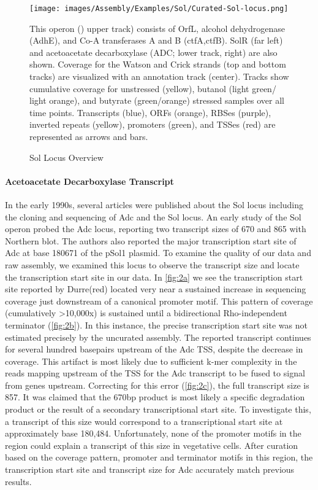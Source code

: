 \begin{figure}
\small
{\texttt{[image: images/Assembly/Examples/Sol/Curated-Sol-locus.png]}
\label{fig:1a}}
\caption{Sol Locus Overview} This operon () upper track) consists of OrfL, alcohol dehydrogenase (AdhE), and Co-A transferases A and B (ctfA,ctfB). SolR (far left) and acetoacetate decarboxylase (ADC;  lower track, right) are also shown. Coverage for the Watson and Crick strands (top and bottom tracks) are visualized with an annotation track (center). Tracks show cumulative coverage for unstressed (yellow), butanol (light green/ light orange), and butyrate (green/orange) stressed samples over all time points. Transcripts (blue), ORFs (orange), RBSes (purple), inverted repeats (yellow), promoters (green), and TSSes (red) are represented as arrows and bars.
\end{figure}

\paragraph{Acetoacetate Decarboxylase Transcript}
In the early 1990s, several articles were published about the Sol locus including the cloning and sequencing of Adc and the Sol locus\cite{62,63,64,65,66}. An early study of the Sol operon probed the Adc locus, reporting two transcript sizes of 670 and 865 with Northern blot\cite{65}. The authors also reported the major transcription start site of Adc at base 180671 of the pSol1 plasmid. To examine the quality of our data and raw assembly, we examined this locus to observe the transcript size and locate the transcription start site in our data. In \ref{fig:2a} we see the transcription start site reported by Durre(red) located very near a sustained increase in sequencing coverage just downstream of a canonical promoter motif. This pattern of coverage (cumulatively \textgreater 10,000x) is sustained until a bidirectional Rho-independent terminator (\ref{fig:2b}). In this instance, the precise transcription start site was not estimated precisely by the uncurated assembly. The reported transcript continues for several hundred basepairs upstream of the Adc TSS, despite the decrease in coverage. This artifact is most likely due to sufficient k-mer complexity in the reads mapping upstream of the TSS for the Adc transcript to be fused to signal from genes upstream. Correcting for this error (\ref{fig:2c}), the full transcript size is 857. It was claimed that the 670bp product is most likely a specific degradation product or the result of a secondary transcriptional start site\cite{65}. To investigate this, a transcript of this size would correspond to a transcriptional start site at approximately base 180,484. Unfortunately, none of the promoter motifs in the region could explain a transcript of this size in vegetative cells. After curation based on the coverage pattern, promoter and terminator motifs in this region, the transcription start site and transcript size for Adc accurately match previous results. 

